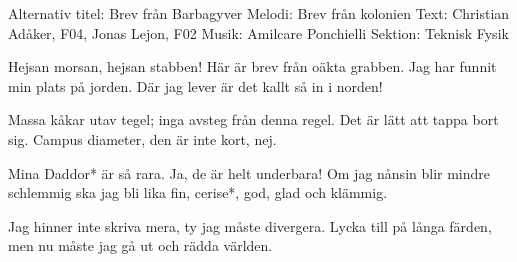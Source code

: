 \begin{song}


\begin{songmeta}
Alternativ titel: Brev från Barbagyver
Melodi: Brev från kolonien
Text: Christian Adåker, F04, Jonas Lejon, F02
Musik: Amilcare Ponchielli
Sektion: Teknisk Fysik
\end{songmeta}

\begin{songtext}
Hejsan morsan, hejsan stabben!
Här är brev från oäkta grabben.
Jag har funnit min plats på jorden.
Där jag lever är det kallt så in i norden!

Massa kåkar utav tegel;
inga avsteg från denna regel.
Det är lätt att tappa bort sig.
Campus diameter, den är inte kort, nej.

Mina Daddor* är så rara.
Ja, de är helt underbara!
Om jag nånsin blir mindre schlemmig
ska jag bli lika fin, cerise*, god, glad och klämmig.

Jag hinner inte skriva mera,
ty jag måste divergera.
Lycka till på långa färden,
men nu måste jag gå ut och rädda världen.
\end{songtext}

\begin{songnotes}

\end{songnotes}

\end{song}
